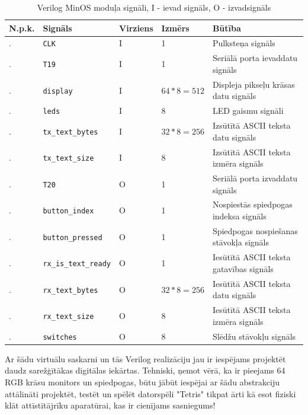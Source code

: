 \begin{table}[H]
    \newcommand\rownumber{\stepcounter{minossignalcounter}\arabic{minossignalcounter}.}
    \begin{tabular}{ |p{1cm}|p{3cm}|p{2cm}|p{3cm}|p{6cm}| }
    \hline
    N.p.k.&Signāls&Virziens&Izmērs&Būtība \\
    \hline
    \rownumber&\lstinline!CLK!&I&1&Pulksteņa signāls \\
    \hline
    \rownumber&\lstinline!T19!&I&1&Seriālā porta ievaddatu signāls \\
    \hline
    \rownumber&\lstinline!display!&I&\(64 * 8 = 512\)&Displeja pikseļu krāsas datu signāls \\
    \hline
    \rownumber&\lstinline!leds!&I&8&LED gaismu signāli \\
    \hline
    \rownumber&\lstinline!tx_text_bytes!&I&\(32 * 8 = 256\)&Izsūtītā ASCII teksta datu signāls \\
    \hline
    \rownumber&\lstinline!tx_text_size!&I&8&Izsūtītā ASCII teksta izmēra signāls \\
    \hline
    \rownumber&\lstinline!T20!&O&1&Seriālā porta izvaddatu signāls \\
    \hline
    \rownumber&\lstinline!button_index!&O&1&Nospiestās spiedpogas indeksa signāls \\
    \hline
    \rownumber&\lstinline!button_pressed!&O&1&Spiedpogas nospiešanas stāvokļa signāls \\
    \hline
    \rownumber&\lstinline!rx_is_text_ready!&O&1&Iesūtītā ASCII teksta gatavības signāls \\
    \hline
    \rownumber&\lstinline!rx_text_bytes!&O&\(32 * 8 = 256\)&Iesūtītā ASCII teksta datu signāls \\
    \hline
    \rownumber&\lstinline!rx_text_size!&O&8&Iesūtītā ASCII teksta izmēra signāls \\
    \hline
    \rownumber&\lstinline!switches!&O&8&Slēdžu stāvokļu signāls \\
    \hline
    \end{tabular}
    \centering
    \captionsetup{justification=centering}
    \caption{Verilog MinOS moduļa signāli, I - ievad signāls, O - izvadsignāls}
    \label{table:minossignals}
\end{table}

Ar šādu virtuālu saskarni un tās Verilog realizāciju jau ir iespējams projektēt
daudz sarežģītākas digitālas iekārtas. Tehniski, ņemot vērā, ka ir pieejams 64
RGB krāsu monitors un spiedpogas, būtu jābūt iespējai ar šādu abstrakciju
attālināti projektēt, testēt un spēlēt datorspēli "Tetris" tikpat ārti kā esot
fiziski klāt attīstītājrīku aparatūrai, kas ir cienījams sasniegums!

